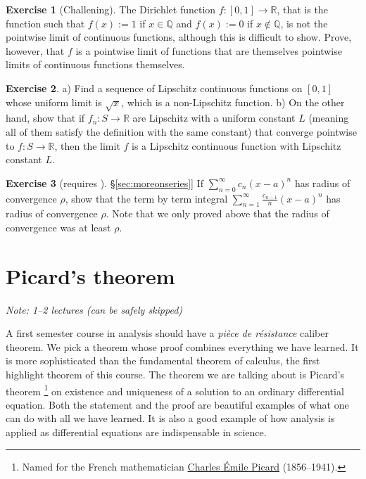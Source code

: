 \documentclass[12pt]{book}
\newcommand{\R}{{\mathbb{R}}}
\newcommand{\Q}{{\mathbb{Q}}}
\newcommand{\sectionnotes}[1]{\noindent \emph{Note: #1} \medskip \par}
\newcommand{\sectionnewpage}{\clearpage}
\theoremstyle{plain}
\theoremstyle{remark}
\theoremstyle{definition}
\theoremstyle{exercise}
\newtheorem{exercise}{Exercise}[section]
\theoremstyle{example}
\newcommand{\sectionref}[1]{\hyperref[#1]{\S\ref*{#1}}}
\begin{document}
\begin{exercise}[Challening]
The Dirichlet function
$f \colon [0,1] \to \R$, that is the
function such that $f(x) := 1$ if $x \in \Q$
and $f(x) := 0$ if $x \notin \Q$,
is not the pointwise limit of
continuous functions, although this is difficult to show.
Prove, however, that $f$ is a pointwise limit of functions that are themselves
pointwise limits of
continuous functions themselves.
\end{exercise}

\begin{exercise}
a) Find a sequence of Lipschitz continuous functions on $[0,1]$
whose uniform limit is $\sqrt{x}$, which is a non-Lipschitz function.
b) On the other hand, show that if $f_n \colon S \to \R$ are Lipschitz
with a uniform constant $L$ (meaning all of them satisfy the definition
with the same constant) that converge pointwise to $f \colon S \to \R$,
then the limit $f$ is a Lipschitz continuous function
with Lipschitz constant $L$.
\end{exercise}

\begin{exercise}[requires \sectionref{sec:moreonseries}]
If $\sum_{n=0}^\infty c_n {(x-a)}^n$ has radius of convergence $\rho$,
show that the term by term integral
$\sum_{n=1}^\infty \frac{c_{n-1}}{n} {(x-a)}^n$ has radius of convergence
$\rho$.  Note that we only proved above that the radius of convergence was
at least $\rho$.
\end{exercise}


\sectionnewpage
\section{Picard's theorem}
\label{sec:picard}

\sectionnotes{1--2 lectures (can be safely skipped)}

A first semester course in analysis should have
a \emph{pi\`ece de r\'esistance} caliber
theorem.  We pick a theorem whose proof combines everything we have
learned.  It is more sophisticated than the fundamental theorem of calculus,
the first highlight theorem of this course.  The
theorem we are talking about is Picard's
theorem%
\footnote{Named for the French mathematician
\href{http://en.wikipedia.org/wiki/\%C3\%89mile_Picard}{Charles \'Emile Picard}
(1856--1941).}
on existence and uniqueness of a solution to an ordinary differential equation.
Both the statement and the proof are beautiful examples of what one can do
with all we have learned.  It is also a good example of how analysis is
applied as differential equations are indispensable in science.
\end{document}
